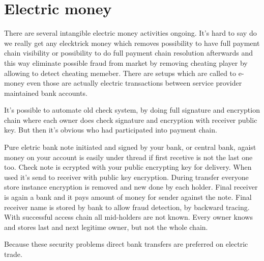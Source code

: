\section{Electric money}
There are several intangible electric money activities ongoing. It's hard to say do we really get any elecktrick money which removes possibility to have full payment chain visibility or possibility to do full payment chain resolution afterwards and this way eliminate possible fraud from market by removing cheating player by allowing to detect cheating memeber. There are setups which are called to e-money even those are actually electric transactions between service provider maintained bank accounts.

It's possible to automate old check system, by doing full signature and encryption chain where each owner does check signature and encryption with receiver public key. But then it's obvious who had participated into payment chain.

Pure eletric bank note initiated and signed by your bank, or central bank, agaist money on your account is easily under thread if first recetive is not the last one too. Check note is ecrypted with your public encrypting key for delivery. When used it's send to receiver with public key encryption. During transfer everyone store instance encryption is removed and new done by each holder. Final receiver is again a bank and it pays amount of money for sender against the note. Final receiver name is stored by bank to allow fraud detection, by backward tracing. With successful access chain all mid-holders are not known. Every owner knows and stores last and next legitime owner, but not the whole chain.

Because these security problems direct bank transfers are preferred on electric trade.

